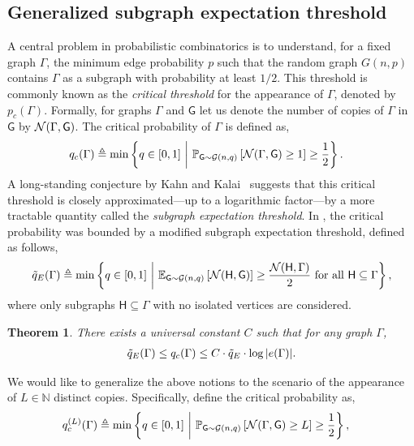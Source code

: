 \documentclass[12pt]{article}
\newtheorem{theorem}{Theorem}
\newcommand{\E}{\mathbb{E}}
\def\P{{\mathbb P}}
\newcommand{\calG}{{\cal G}}
\newcommand{\calN}{{\cal N}}
\newcommand{\pp}[1]{\left[#1\right]}
\newcommand{\ppp}[1]{\left\{#1\right\}}
\newcommand{\s}[1]{\mathsf{#1}}
\begin{document}
\subsection{Generalized subgraph expectation threshold}\label{app:GeneralizedExpecTThreshold}

A central problem in probabilistic combinatorics is to understand, for a fixed graph $\Gamma$, the minimum edge probability $p$ such that the random graph $ G(n, p) $ contains $\Gamma$ as a subgraph with probability at least $ 1/2 $. This threshold is commonly known as the \emph{critical threshold} for the appearance of $\Gamma$, denoted by $ p_c(\Gamma) $. Formally, for graphs $\Gamma$ and $\s{G}$ let us denote the number of copies of $\Gamma$ in $\s{G}$ by $\calN(\Gamma,\s{G})$. The critical probability of $\Gamma$ is defined as,
\begin{align}
    q_c(\Gamma)&\triangleq\min\ppp{q\in[0,1] ~\bigg|~ \P_{\s{G}\sim \calG(n,q)}\pp{\calN(\Gamma,\s{G})\geq 1}\geq \frac{1}{2}}.
    \end{align}
A long-standing conjecture by Kahn and Kalai~\cite{kahn2007thresholds} suggests that this critical threshold is closely approximated—up to a logarithmic factor—by a more tractable quantity called the \emph{subgraph expectation threshold}. In \cite{mossel2022second}, the critical probability was bounded by a modified subgraph expectation threshold, defined as follows,
\begin{align}
    \Tilde{q}_E(\Gamma)\triangleq\min\ppp{q\in[0,1] ~\bigg|~ \E_{\s{G}\sim \calG(n,q)}\pp{\calN(\s{H},\s{G})}\geq \frac{\calN(\s{H},\Gamma)}{2}\text{ for all }\s{H}\subseteq \Gamma},
\end{align} 
where only subgraphs $\s{H}\subseteq \Gamma$ with no isolated vertices are considered.
\begin{theorem}\cite[Theorem 1]{mossel2022second} \label{th:Zadik} There exists a universal constant $C$ such that for any graph $\Gamma$, \begin{align}
    \Tilde{q}_E(\Gamma)\leq q_c(\Gamma)\leq C\cdot \Tilde{q}_E\cdot  \log|e(\Gamma)|.
\end{align}
\end{theorem}
We would like to generalize the above notions to the scenario of the appearance of $L\in\mathbb{N}$ distinct copies. Specifically, define the critical probability as,
\begin{align}
    q_{c}^{(L)}(\Gamma)&\triangleq\min\ppp{q\in[0,1] ~\bigg|~ \P_{\s{G}\sim \calG(n,q)}\pp{\calN(\Gamma,\s{G})\geq L}\geq \frac{1}{2}},\label{eqn:qCl}
    \end{align}
\end{document}

